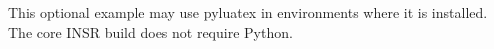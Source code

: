 \documentclass[config/load-project=false,document/type=paper,metadata/title={Optional pyluatex Example},metadata/author={INSR Example Author},metadata/institution={INSR Example Institution}]{insr}
\begin{document}
\INSRMakeTitle
{}
This optional example may use pyluatex in environments where it is installed. The core INSR build does not require Python.
\end{document}
